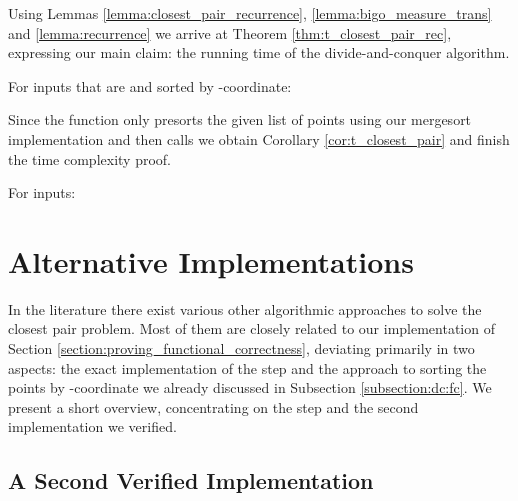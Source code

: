 \begin{isabellebody}
\begin{isamarkuptext}
Using Lemmas \ref{lemma:closest_pair_recurrence}, \ref{lemma:bigo_measure_trans} and \ref{lemma:recurrence}
we arrive at Theorem \ref{thm:t_closest_pair_rec}, expressing our main claim: the running time of the
divide-and-conquer algorithm.

\begin{theorem} \label{thm:t_closest_pair_rec}
For inputs that are  and sorted by -coordinate: \vskip 0pt
\end{theorem}

Since the function  only presorts the given list of points using our mergesort implementation and
then calls  we obtain Corollary \ref{cor:t_closest_pair}
and finish the time complexity proof.

\begin{corollary} \label{cor:t_closest_pair}
For  inputs:
\end{corollary}


\section{Alternative Implementations} \label{section:alt_impl}

In the literature there exist various other algorithmic approaches to solve the closest pair problem.
Most of them are closely related to our implementation of Section \ref{section:proving_functional_correctness},
deviating primarily in two aspects: the exact implementation of the  step and the approach
to sorting the points by -coordinate we already discussed in Subsection \ref{subsection:dc:fc}. We
present a short overview, concentrating on the  step and the second implementation we verified.

\subsection{A Second Verified Implementation} \label{subsection:snd}


\end{isamarkuptext}
\end{isabellebody}
